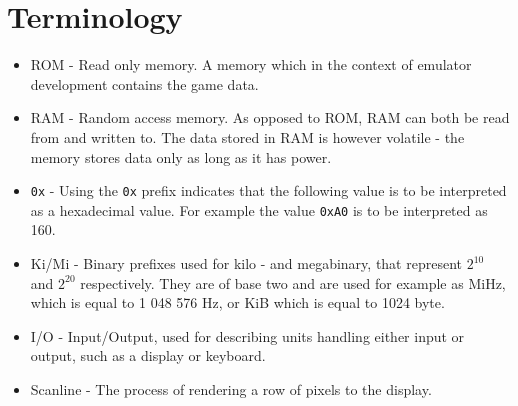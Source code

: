 \chapter*{Terminology}
\thispagestyle{plain}			%

\begin{itemize}
    \item ROM - Read only memory. A memory which in the context of emulator development contains the game data.
    \item RAM - Random access memory. As opposed to ROM, RAM can both be read from and written to. The data stored in RAM is however volatile - the memory stores data only as long as it has power.
    \item \texttt{0x} - Using the \texttt{0x} prefix indicates that the following value is to be interpreted as a hexadecimal value. For example the value \texttt{0xA0} is to be interpreted as 160.
    \item Ki/Mi - Binary prefixes used for kilo - and megabinary, that represent $2^{10}$ and $2^{20}$ respectively. They are of base two and are used for example as MiHz, which is equal to 1 048 576 Hz, or KiB which is equal to 1024 byte.
    \item I/O - Input/Output, used for describing units handling either input or output, such as a display or keyboard.
    \item Scanline - The process of rendering a row of pixels to the display.
\end{itemize}

\newpage				%
\thispagestyle{plain}